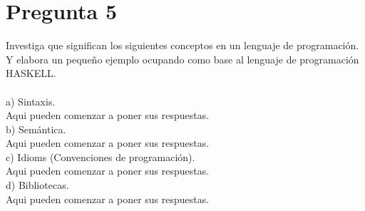 \newpage
\section*{Pregunta 5}
\Large
Investiga que significan los siguientes conceptos en un lenguaje de programación. Y elabora un pequeño ejemplo ocupando como base al lenguaje de programación HASKELL.\\\\
a) Sintaxis.\\
\newline
\large
Aqui pueden comenzar a poner sus respuestas.\\
\newline
\Large
b) Semántica.\\
\newline
\large
Aqui pueden comenzar a poner sus respuestas.\\
\newline
\Large
c) Idioms (Convenciones de programación).\\
\newline
\large
Aqui pueden comenzar a poner sus respuestas.\\
\newline
\Large
d) Bibliotecas.\\
\newline
\large
Aqui pueden comenzar a poner sus respuestas.\\
